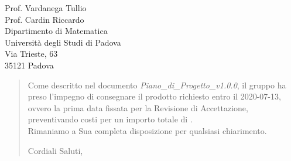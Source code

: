 \begin{letter}{
		Prof. Vardanega Tullio \\
		Prof. Cardin Riccardo \\
		Dipartimento di Matematica \\
		Università degli Studi di Padova \\
		Via Trieste, 63 \\
		35121 Padova}
\begin{quotation}
\noindent Come descritto nel documento \textit{Piano\_di\_Progetto\_v1.0.0}, il gruppo ha preso l'impegno di consegnare il prodotto richiesto entro il 2020-07-13, ovvero la prima data fissata per la Revisione di Accettazione, preventivando costi per un importo 
totale di \textbf{}.\\
Rimaniamo a Sua completa disposizione per qualsiasi chiarimento.

\vspace{0.5cm}
\closing{ Cordiali Saluti,}
	

\end{quotation}
		
\end{letter}